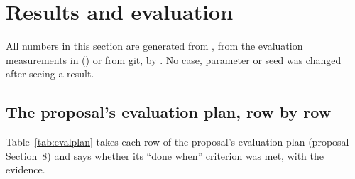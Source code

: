 \section{Results and evaluation}\label{sec:results}
All numbers in this section are generated from , from the evaluation measurements in  () or from git, by . No case, parameter or seed was changed after seeing a result.

\subsection{The proposal's evaluation plan, row by row}
Table~\ref{tab:evalplan} takes each row of the proposal's evaluation plan (proposal Section~8) and says whether its ``done when'' criterion was met, with the evidence.

